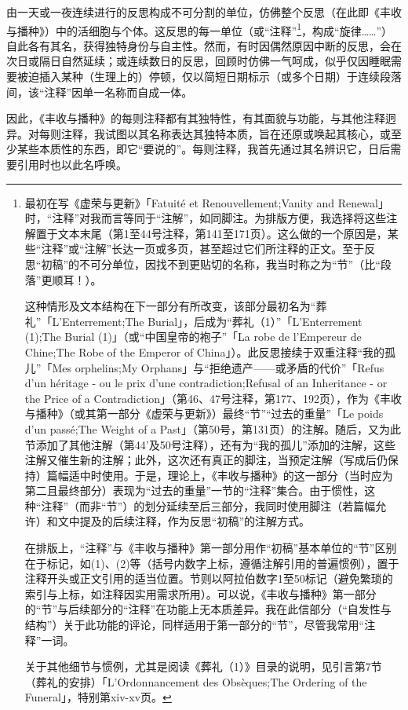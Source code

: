 由一天或一夜连续进行的反思构成不可分割的单位，仿佛整个反思（在此即《丰收与播种》）中的活细胞与个体。这反思的每一单位（或“注释”\footnote{最初在写《虚荣与更新》「Fatuité et Renouvellement;Vanity and Renewal」时，“注释”对我而言等同于“注解”，如同脚注。为排版方便，我选择将这些注解置于文本末尾（第1至44号注释，第141至171页）。这么做的一个原因是，某些“注释”或“注解”长达一页或多页，甚至超过它们所注释的正文。至于反思“初稿”的不可分单位，因找不到更贴切的名称，我当时称之为“节”（比“段落”更顺耳！）。

这种情形及文本结构在下一部分有所改变，该部分最初名为“葬礼”「L'Enterrement;The Burial」，后成为“葬礼（1）”「L'Enterrement (1);The Burial (1)」（或“中国皇帝的袍子”「La robe de l'Empereur de Chine;The Robe of the Emperor of China」）。此反思接续于双重注释“我的孤儿”「Mes orphelins;My Orphans」与“拒绝遗产——或矛盾的代价”「Refus d'un héritage - ou le prix d'une contradiction;Refusal of an Inheritance - or the Price of a Contradiction」（第46、47号注释，第177、192页），作为《丰收与播种》（或其第一部分《虚荣与更新》）最终“节”“过去的重量”「Le poids d'un passé;The Weight of a Past」（第50号，第131页）的注解。随后，又为此节添加了其他注解（第44'及50号注释），还有为“我的孤儿”添加的注解，这些注解又催生新的注解；此外，这次还有真正的脚注，当预定注解（写成后仍保持）篇幅适中时使用。于是，理论上，《丰收与播种》的这一部分（当时应为第二且最终部分）表现为“过去的重量”一节的“注释”集合。由于惯性，这种“注释”（而非“节”）的划分延续至后三部分，我同时使用脚注（若篇幅允许）和文中提及的后续注释，作为反思“初稿”的注解方式。

在排版上，“注释”与《丰收与播种》第一部分用作“初稿”基本单位的“节”区别在于标记，如(1)、(2)等（括号内数字上标，遵循注解引用的普遍惯例），置于注释开头或正文引用的适当位置。节则以阿拉伯数字1至50标记（避免繁琐的索引与上标，如注释因实用需求所用）。可以说，《丰收与播种》第一部分的“节”与后续部分的“注释”在功能上无本质差异。我在此信部分（“自发性与结构”）关于此功能的评论，同样适用于第一部分的“节”，尽管我常用“注释”一词。

关于其他细节与惯例，尤其是阅读《葬礼（1）》目录的说明，见引言第7节（葬礼的安排）「L'Ordonnancement des Obsèques;The Ordering of the Funeral」，特别第xiv-xv页。}，构成“旋律……”）自此各有其名，获得独特身份与自主性。然而，有时因偶然原因中断的反思，会在次日或隔日自然延续；或连续数日的反思，回顾时仿佛一气呵成，似乎仅因睡眠需要被迫插入某种（生理上的）停顿，仅以简短日期标示（或多个日期）于连续段落间，该“注释”因单一名称而自成一体。

因此，《丰收与播种》的每则注释都有其独特性，有其面貌与功能，与其他注释迥异。对每则注释，我试图以其名称表达其独特本质，旨在还原或唤起其核心，或至少某些本质性的东西，即它“要说的”。每则注释，我首先通过其名辨识它，日后需要引用时也以此名呼唤。

